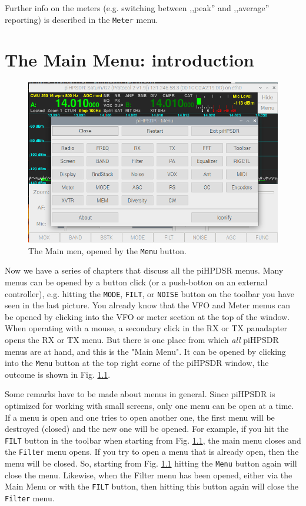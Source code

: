 \documentclass[12pt]{book}
\def\rett#1{\texttt{\color{red}#1}}
\def\bltt#1{\texttt{\color{blue}#1}}
\begin{document}
Further info on the meters (e.g. switching between ,,peak'' and ,,average'' reporting)
is described in the \bltt{Meter} menu.

\chapter{The Main Menu: introduction}

\begin{figure}[h]
\center
\includegraphics[width=12cm]{MainMenu.png}
\caption{The Main men, opened by the \rett{Menu} button.}
\label{fig:MainMenu}
\end{figure}

Now we have a series of chapters that discuss all the piHPDSR menus. Many menus can be
opened by a button click (or a push-botton on an external controller), e.g. hitting the
 \rett{MODE}, \rett{FILT}, or \rett{NOISE} button on the
toolbar you have seen in the last picture. You already know that the VFO and Meter
menus can be opened by clicking into the VFO or meter section at the top of the window.
When operating with a mouse, a secondary click in the RX or TX panadapter opens the
RX or TX menu. But there is one place from which \textit{all} piHPSDR menus are at hand,
and this is the "Main Menu". It can be opened by clicking into the \rett{Menu} button at the
top right corne of the piHPSDR window, the outcome is shown in Fig. \ref{fig:MainMenu}.

Some remarks have to be made about menus in general. Since piHPSDR is optimized for
working with small screens, only one menu can be open at a time. If a menu is open
and one tries to open another one, the first menu will be destroyed (closed) and the
new one will be opened. For example, if you hit the \rett{FILT} button in the toolbar
when starting from Fig. \ref{fig:MainMenu}, the main menu closes and the \bltt{Filter} menu
opens. If you try to open a menu that is already open, then the menu will be closed.
So, starting from Fig. \ref{fig:MainMenu} hitting the \rett{Menu} button again will close
the menu. Likewise, when the Filter menu has been opened, either via the Main Menu
or with the \rett{FILT} button, then hitting this button again will close the 
\bltt{Filter} menu.
\end{document}

